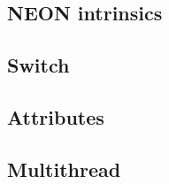 \subsection{NEON intrinsics}


\subsection{Switch}


\subsection{Attributes}


\subsection{Multithread}

